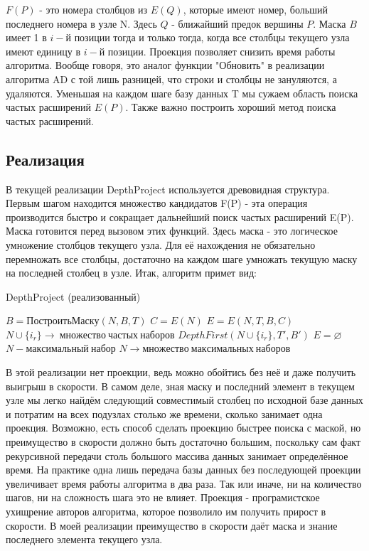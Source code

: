 \documentclass[a4paper, 12pt, oneside]{scrartcl}
\begin{document}
$F(P)$ - это номера столбцов из $E(Q)$, которые имеют номер, больший последнего номера в узле N. Здесь $Q$ - ближайший предок вершины $P$. Маска $B$ имеет 1 в $i-й$ позиции тогда и только тогда, когда все столбцы текущего узла имеют единицу в $i-й$ позиции. Проекция позволяет снизить время работы алгоритма. Вообще говоря, это аналог функции "Обновить" в реализации алгоритма AD с той лишь разницей, что строки и столбцы не зануляются, а удаляются. Уменьшая на каждом шаге базу данных T мы сужаем область поиска частых расширений $E(P)$. Также важно построить хороший метод поиска частых расширений.

\subsection{Реализация}

В текущей реализации DepthProject используется древовидная структура. Первым шагом находится множество кандидатов F(P) - эта операция производится быстро и сокращает дальнейший поиск частых расширений E(P). Маска готовится перед вызовом этих функций. Здесь маска - это логическое умножение столбцов текущего узла. Для её нахождения не обязательно перемножать все столбцы, достаточно на каждом шаге умножать текущую маску на последней столбец в узле. Итак, алгоритм примет вид:

\begin{algorithm}
\caption{DepthProject (реализованный)}\label{alg:Examples}
\begin{algorithmic}[1]
	\State $B = ПостроитьМаску(N, B, T)$
	\State $C = E(N)$
	\State $E = E(N, T, B, C)$
		\State $N \cup \{i_r\} \rightarrow \ множество\ частых\ наборов$
		\State $DepthFirst(N \cup \{i_r\}, T', B')$
	\EndFor
	\If $E = \varnothing$
		\If $N - максимальный\ набор$
			\State $N \rightarrow множество\ максимальных\ наборов$
		\EndIf
	\EndIf
\EndProcedure
\end{algorithmic}
\end{algorithm}

В этой реализации нет проекции, ведь можно обойтись без неё и даже получить выигрыш в скорости. В самом деле, зная маску и последний элемент в текущем узле мы легко найдём следующий совместимый столбец по исходной базе данных и потратим на всех подузлах столько же времени, сколько занимает одна проекция. \color{red} Возможно, есть способ сделать проекцию быстрее поиска с маской, но преимущество в скорости должно быть достаточно большим, поскольку сам факт рекурсивной передачи столь большого массива данных занимает определённое время. На практике одна лишь передача базы данных без последующей проекции увеличивает время работы алгоритма в два раза. Так или иначе, ни на количество шагов, ни на сложность шага это не влияет. Проекция - програмистское ухищрение авторов алгоритма, которое позволило им получить прирост в скорости. В моей реализации преимущество в скорости даёт маска и знание последнего элемента текущего узла.
\end{document}
